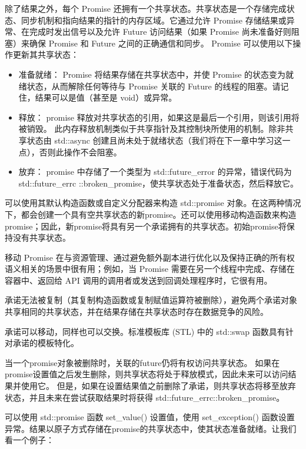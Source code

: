 除了结果之外，每个 Promise 还拥有一个共享状态。共享状态是一个存储完成状态、同步机制和指向结果的指针的内存区域。它通过允许 Promise 存储结果或异常、在完成时发出信号以及允许 Future 访问结果（如果 Promise 尚未准备好则阻塞）来确保 Promise 和 Future 之间的正确通信和同步。 Promise 可以使用以下操作更新其共享状态：

\begin{itemize}
\item
准备就绪： Promise 将结果存储在共享状态中，并使 Promise 的状态变为就绪状态，从而解除任何等待与 Promise 关联的 Future 的线程的阻塞。请记住，结果可以是值（甚至是 void）或异常。

\item
释放： promise 释放对共享状态的引用，如果这是最后一个引用，则该引用将被销毁。
此内存释放机制类似于共享指针及其控制块所使用的机制。除非共享状态由 std::async 创建且尚未处于就绪状态（我们将在下一章中学习这一点），否则此操作不会阻塞。

\item
放弃： promise 中存储了一个类型为 std::future\_error 的异常，错误代码为 std::future\_errc ::broken\_promise，使共享状态处于准备状态，然后释放它。
\end{itemize}

可以使用其默认构造函数或自定义分配器来构造 std::promise 对象。在这两种情况下，都会创建一个具有空共享状态的新promise。还可以使用移动构造函数来构造promise；因此，新promise将具有另一个承诺拥有的共享状态。初始promise将保持没有共享状态。

移动 Promise 在与资源管理、通过避免额外副本进行优化以及保持正确的所有权语义相关的场景中很有用；例如，当 Promise 需要在另一个线程中完成、存储在容器中、返回给 API 调用的调用者或发送到回调处理程序时，它很有用。

承诺无法被复制（其复制构造函数或复制赋值运算符被删除），避免两个承诺对象共享相同的共享状态，并在结果存储在共享状态时存在数据竞争的风险。

承诺可以移动，同样也可以交换。标准模板库 (STL) 中的 std::swap 函数具有针对承诺的模板特化。

当一个promise对象被删除时，关联的future仍将有权访问共享状态。 如果在promise设置值之后发生删除，则共享状态将处于释放模式，因此未来可以访问结果并使用它。 但是，如果在设置结果值之前删除了承诺，则共享状态将移至放弃状态，并且未来在尝试获取结果时将获得 std::future\_errc::broken\_promise。

可以使用 std::promise 函数 set\_value() 设置值，使用 set\_exception() 函数设置异常。结果以原子方式存储在promise的共享状态中，使其状态准备就绪。让我们看一个例子：

